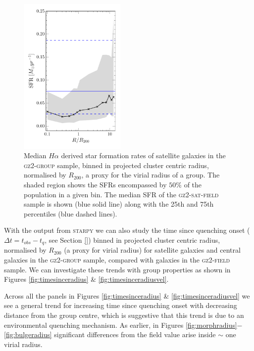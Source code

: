 \documentclass[useAMS,usenatbib]{mn2e}
\def\starpy ~{\textsc{starpy}}
\begin{document}
{\begin{figure}
\includegraphics[width=0.46\textwidth]{sfr_trend_with_log_radius_field_matched_blue_dashed_hlines_gomez_03_rv_not_r200.pdf}
\caption{Median $H\alpha$ derived star formation rates of satellite galaxies in the \textsc{gz2-group} sample, binned in projected cluster centric radius, normalised by $R_{200}$, a proxy for the virial radius of a group.  The shaded region shows the SFRs encompassed by $50\%$ of the population in a given bin. The median SFR of the \textsc{gz2-sat-field} sample is shown (blue solid line) along with the 25th and 75th percentiles (blue dashed lines).}
\label{fig:sfrradius}
\end{figure}


With the output from \starpy~ we can also study the time since quenching onset ($\Delta t = t_{obs} - t_{q}$, see Section \ref{}) binned in projected cluster centric radius, normalised by $R_{200}$ (a proxy for virial radius) for satellite galaxies and central galaxies in the \textsc{gz2-group} sample, compared with galaxies in the \textsc{gz2-field} sample. We can investigate these trends with group properties as shown in Figures \ref{fig:timesinceradius} \& \ref{fig:timesinceradiusvel}. 

Across all the panels in Figures \ref{fig:timesinceradius} \& \ref{fig:timesinceradiusvel} we see a general trend for increasing time since quenching onset with decreasing distance from the group centre, which is suggestive that this trend is due to an environmental quenching mechanism. As earlier, in Figures \ref{fig:morphradius}$-$\ref{fig:bulgeradius} significant differences from the field value arise inside $\sim$ one virial radius. 

}
\end{document}
